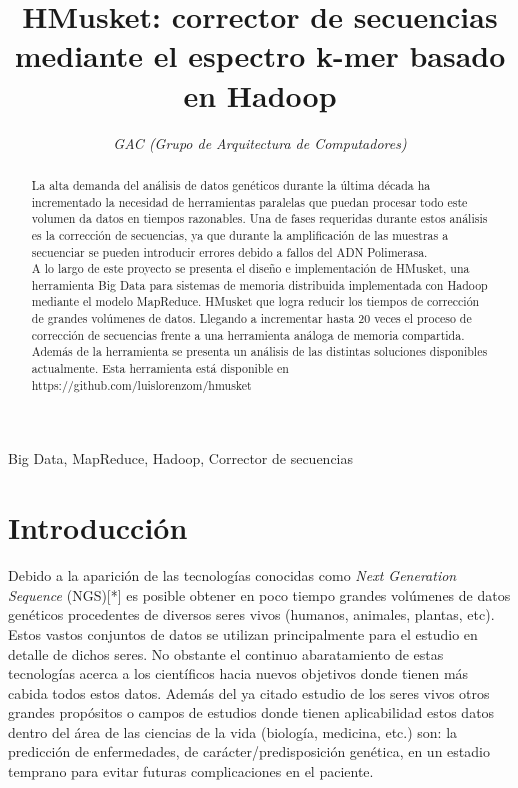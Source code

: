 \documentclass[conference]{IEEEtran}
\begin{document}
\title{HMusket: corrector de secuencias mediante el espectro k-mer basado en Hadoop}

\author{
	\textit{GAC (Grupo de Arquitectura de Computadores)}\\
}

\maketitle

\begin{abstract}
La alta demanda del análisis de datos genéticos durante la última década ha incrementado la necesidad de herramientas paralelas que puedan procesar todo este volumen da datos en tiempos razonables. Una de fases requeridas durante estos análisis es la corrección de secuencias, ya que durante la amplificación de las muestras a secuenciar se pueden introducir errores debido a fallos del ADN Polimerasa.\\
A lo largo de este proyecto se presenta el diseño e implementación de HMusket, una herramienta Big Data para sistemas de memoria distribuida implementada con Hadoop mediante el modelo MapReduce. HMusket que logra reducir los tiempos de corrección de grandes volúmenes de datos. Llegando a incrementar hasta 20 veces el proceso de corrección de secuencias frente a una herramienta análoga de memoria compartida. Además de la herramienta se presenta un análisis de las distintas soluciones disponibles actualmente. Esta herramienta está disponible en https://github.com/luislorenzom/hmusket
\end{abstract}

\begin{IEEEkeywords}
Big Data, MapReduce, Hadoop, Corrector de secuencias
\end{IEEEkeywords}

\section{Introducción}
Debido a la aparición de las tecnologías conocidas como \textit{Next Generation Sequence} (NGS)[*] es posible obtener en poco tiempo grandes volúmenes de datos genéticos procedentes de diversos seres vivos (humanos, animales, plantas, etc). Estos vastos conjuntos de datos se utilizan principalmente para el estudio en detalle de dichos seres. 
No obstante el continuo abaratamiento de estas tecnologías acerca a los científicos hacia nuevos objetivos donde tienen más cabida todos estos datos. Además del ya citado estudio de los seres vivos otros grandes propósitos o campos de estudios donde tienen aplicabilidad estos datos dentro del área de las ciencias de la vida (biología, medicina, etc.) son: la predicción de enfermedades, de carácter/predisposición genética, en un estadio temprano para evitar futuras complicaciones en el paciente. \\
\end{document}
